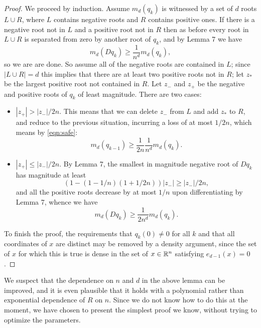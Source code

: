 \begin{proof}
 We proceed by induction.
Assume $m_d(q_k)$ is witnessed by a set of $d$ roots $L\cup R$, where $L$ contains negative roots
and $R$ contains positive ones. If there is a negative root not in $L$ and a positive root not in $R$
then as before every root in $L\cup R$ is separated from zero by another root of $q_k$, and by Lemma 7 we have
\begin{equation}\label{eqn:safe} m_d(Dq_k)\ge \frac{1}{n^d}m_d(q_k),\end{equation}
so we are are done. So assume all of the negative roots are contained in $L$; since $|L\cup R|=d$ this implies
that there are at least two positive roots not in $R$; let $z_*$ be the largest positive root not contained in $R$.
Let $z_-$ and $z_+$ be the negative and positive roots of $q_k$ of least magnitude. 
There are two cases:
\begin{itemize}
\item $|z_+|>|z_-|/2n$. This means that we can delete $z_-$ from $L$ and add $z_*$ to $R$, and reduce to the previous situation,
incurring a loss of at most $1/2n$, which means by \eqref{eqn:safe}:
$$ m_d(q_{k-1})\ge \frac{1}{2n}\frac{1}{n^d}m_d(q_k).$$
\item $|z_+|\le |z_-|/2n$. By  Lemma 7, the smallest in magnitude negative root of $Dq_k$ has magnitude at least
$$ (1-(1-1/n)(1+1/2n))|z_-|\ge |z_-|/2n,$$
and all the positive roots decrease by at most $1/n$ upon differentiating by Lemma 7, whence we have
$$m_d(Dq_k)\ge \frac{1}{2n^d}m_d(q_k).$$
\end{itemize}

To finish the proof, the requirements that $q_k(0)\neq 0$ for all $k$ and that
all coordinates of $x$ are distinct may be removed by a density argument, since
the set of $x$ for which this is true is dense in the set of $x\in\mathbb{R}^n$
satisfying $e_{d-1}(x)=0$.

\end{proof}
\begin{remark} We suspect that the dependence on $n$ and $d$ in the above lemma can be improved,
	and it is even plausible that it holds with a polynomial rather than exponential dependence of $R$ on $n$. 
	Since we do not know how to do this at the moment, we have chosen to present the simplest proof we know,
	without trying to optimize the parameters.\end{remark}
	

